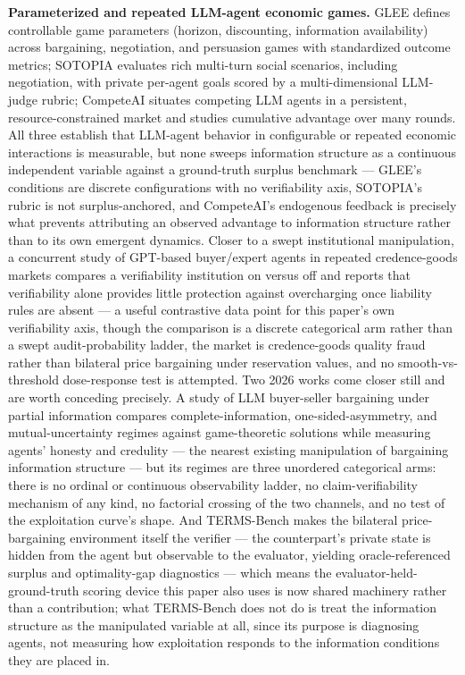 \documentclass[11pt]{article}
\begin{document}
\textbf{Parameterized and repeated LLM-agent economic games.} GLEE \citep{GLEE} defines controllable game parameters (horizon, discounting, information availability) across bargaining, negotiation, and persuasion games with standardized outcome metrics; SOTOPIA \citep{SOTOPIA} evaluates rich multi-turn social scenarios, including negotiation, with private per-agent goals scored by a multi-dimensional LLM-judge rubric; CompeteAI \citep{CompeteAI} situates competing LLM agents in a persistent, resource-constrained market and studies cumulative advantage over many rounds. All three establish that LLM-agent behavior in configurable or repeated economic interactions is measurable, but none sweeps information structure as a continuous independent variable against a ground-truth surplus benchmark --- GLEE's conditions are discrete configurations with no verifiability axis, SOTOPIA's rubric is not surplus-anchored, and CompeteAI's endogenous feedback is precisely what prevents attributing an observed advantage to information structure rather than to its own emergent dynamics. Closer to a swept institutional manipulation, a concurrent study of GPT-based buyer/expert agents in repeated credence-goods markets \citep{InfoAsymMarkets2603} compares a verifiability institution on versus off and reports that verifiability alone provides little protection against overcharging once liability rules are absent --- a useful contrastive data point for this paper's own verifiability axis, though the comparison is a discrete categorical arm rather than a swept audit-probability ladder, the market is credence-goods quality fraud rather than bilateral price bargaining under reservation values, and no smooth-vs-threshold dose-response test is attempted. Two 2026 works come closer still and are worth conceding precisely. A study of LLM buyer-seller bargaining under partial information \citep{UsedCarSalesbots} compares complete-information, one-sided-asymmetry, and mutual-uncertainty regimes against game-theoretic solutions while measuring agents' honesty and credulity --- the nearest existing manipulation of bargaining information structure --- but its regimes are three unordered categorical arms: there is no ordinal or continuous observability ladder, no claim-verifiability mechanism of any kind, no factorial crossing of the two channels, and no test of the exploitation curve's shape. And TERMS-Bench \citep{TERMSBench} makes the bilateral price-bargaining environment itself the verifier --- the counterpart's private state is hidden from the agent but observable to the evaluator, yielding oracle-referenced surplus and optimality-gap diagnostics --- which means the evaluator-held-ground-truth scoring device this paper also uses is now shared machinery rather than a contribution; what TERMS-Bench does not do is treat the information structure as the manipulated variable at all, since its purpose is diagnosing agents, not measuring how exploitation responds to the information conditions they are placed in.
\end{document}
